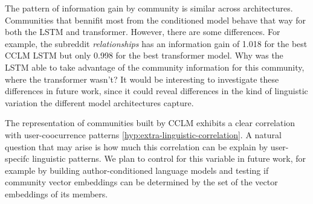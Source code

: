 \documentclass[11pt,a4paper]{article}
\begin{document}
The pattern of information gain by community is similar across architectures.
Communities that bennifit most from the conditioned model behave that way for 
both the LSTM and transformer.
However, there are some differences.
For example, the subreddit \emph{relationships} has an information gain of \num{1.018} for
the best CCLM LSTM but only \num{0.998} for the best transformer model.
Why was the LSTM able to take advantage of the community information for
this community, where the transformer wasn't?
It would be interesting to investigate these differences in future work,
since it could reveal differences in the kind of linguistic variation the different
model architectures capture.

The representation of communities built by CCLM exhibits a clear
correlation with user-coocurrence patterns
\ref{hyp:extra-linguistic-correlation}. A natural
question that may arise is how much this correlation can be explain by
user-specifc linguistic patterns. We plan to control for this variable
in future work, for example by building author-conditioned language
models and testing if community vector embeddings can be determined by
the set of the vector embeddings of its members.



\end{document}

